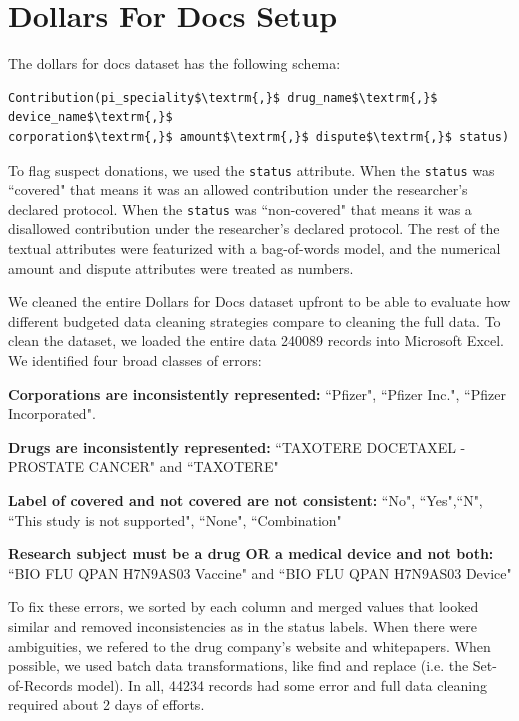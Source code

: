 \section{Dollars For Docs Setup}\label{dfd-errors}
The dollars for docs dataset has the following schema:
\begin{lstlisting}[mathescape,basicstyle={\scriptsize}]
Contribution(pi_speciality$\textrm{,}$ drug_name$\textrm{,}$ device_name$\textrm{,}$
corporation$\textrm{,}$ amount$\textrm{,}$ dispute$\textrm{,}$ status)
\end{lstlisting}
To flag suspect donations, we used the \texttt{status} attribute.
When the \texttt{status} was ``covered" that means it was an allowed contribution under the researcher's declared protocol.
When the \texttt{status} was ``non-covered" that means it was a disallowed contribution under the researcher's declared protocol.
The rest of the textual attributes were featurized with a bag-of-words model, and the numerical amount and dispute attributes were treated as numbers.

We cleaned the entire Dollars for Docs dataset upfront to be able to evaluate how different budgeted data cleaning strategies compare to cleaning the full data.
To clean the dataset, we loaded the entire data 240089 records into Microsoft Excel. We identified four broad classes of errors:
\vspace{0.25em}

\noindent \textbf{Corporations are inconsistently represented: } ``Pfizer", ``Pfizer Inc.", ``Pfizer Incorporated".

\vspace{0.25em}

\noindent \textbf{Drugs are inconsistently represented: } ``TAXOTERE  DOCETAXEL -PROSTATE CANCER" and ``TAXOTERE"

\vspace{0.25em}

\noindent \textbf{Label of covered and not covered are not consistent: } ``No", ``Yes",``N", ``This study is not supported", ``None", ``Combination"

\vspace{0.25em} 

\noindent \textbf{Research subject must be a drug OR a medical device and not both: } ``BIO FLU QPAN H7N9AS03 Vaccine" and ``BIO FLU QPAN H7N9AS03 Device"

\vspace{0.5em} 

To fix these errors, we sorted by each column and merged values that looked similar and removed inconsistencies as in the status labels. 
When there were ambiguities, we refered to the drug company's website and whitepapers.
When possible, we used batch data transformations, like find and replace (i.e. the Set-of-Records model).
In all, 44234 records had some error and full data cleaning required about 2 days of efforts.

